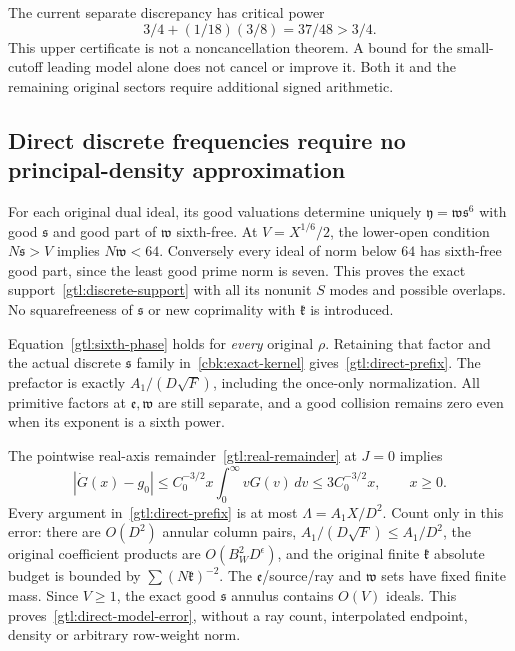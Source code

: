 The current separate discrepancy has critical power
\begin{equation}\label{gtl:discrepancy-power}
 3/4+(1/18)(3/8)=37/48>3/4 .
\end{equation}
This upper certificate is not a noncancellation theorem.
A bound for the small-cutoff leading model alone does
not cancel or improve it. Both it and the remaining
original sectors require additional signed arithmetic.


\subsection{Direct discrete frequencies require no principal-density approximation}
\label{gtl:direct-proof}
For each original dual ideal, its good valuations determine
uniquely $\mathfrak y=\mathfrak w\mathfrak s^6$ with good
$\mathfrak s$ and good part of $\mathfrak w$ sixth-free.
At $V=X^{1/6}/2$, the lower-open condition
$N\mathfrak s>V$ implies $N\mathfrak w<64$.
Conversely every ideal of norm below $64$ has sixth-free
good part, since the least good prime norm is seven.
This proves the exact support~\eqref{gtl:discrete-support}
with all its nonunit $S$ modes and possible overlaps.
No squarefreeness of $\mathfrak s$ or new coprimality with
$\mathfrak k$ is introduced.

Equation~\eqref{gtl:sixth-phase} holds for \emph{every}
original $\rho$. Retaining that factor and the actual
discrete $\mathfrak s$ family in~\eqref{cbk:exact-kernel}
gives~\eqref{gtl:direct-prefix}. The prefactor is exactly
$A_1/(D\sqrt F)$, including the once-only normalization.
All primitive factors at $\mathfrak e,\mathfrak w$ are
still separate, and a good collision remains zero
even when its exponent is a sixth power.

The pointwise real-axis remainder~\eqref{gtl:real-remainder}
at $J=0$ implies
\begin{equation}\label{gtl:direct-Bessel}
 |\dot G(x)-g_0|
    \le C_0^{-3/2}x\int_0^\infty vG(v)\,dv
    \le3C_0^{-3/2}x,\qquad x\ge0 .
\end{equation}
Every argument in~\eqref{gtl:direct-prefix} is at most
$\Lambda=A_1X/D^2$. Count only in this error:
there are $O(D^2)$ annular column pairs,
$A_1/(D\sqrt F)\le A_1/D^2$, the original coefficient
products are $O(B_W^2D^\epsilon)$, and the original
finite $\mathfrak k$ absolute budget is bounded by
$\sum(N\mathfrak k)^{-2}$.
The $\mathfrak e$/source/ray and $\mathfrak w$ sets have
fixed finite mass. Since $V\ge1$, the exact good
$\mathfrak s$ annulus contains $O(V)$ ideals.
This proves~\eqref{gtl:direct-model-error}, without a
ray count, interpolated endpoint, density or arbitrary
row-weight norm.

